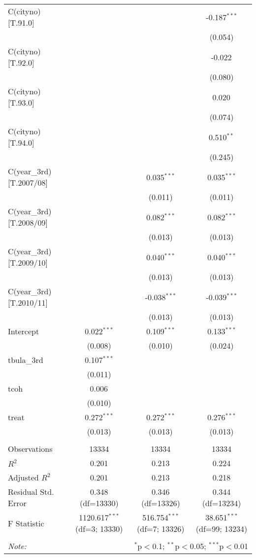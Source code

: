 \begin{table}[!htbp]
\begin{tabular}{@{\extracolsep{5pt}}lccc}
 C(cityno)[T.91.0] & & & -0.187$^{***}$ \\
& & & (0.054) \\
 C(cityno)[T.92.0] & & & -0.022$^{}$ \\
& & & (0.080) \\
 C(cityno)[T.93.0] & & & 0.020$^{}$ \\
& & & (0.074) \\
 C(cityno)[T.94.0] & & & 0.510$^{**}$ \\
& & & (0.245) \\
 C(year_3rd)[T.2007/08] & & 0.035$^{***}$ & 0.035$^{***}$ \\
& & (0.011) & (0.011) \\
 C(year_3rd)[T.2008/09] & & 0.082$^{***}$ & 0.082$^{***}$ \\
& & (0.013) & (0.013) \\
 C(year_3rd)[T.2009/10] & & 0.040$^{***}$ & 0.040$^{***}$ \\
& & (0.013) & (0.013) \\
 C(year_3rd)[T.2010/11] & & -0.038$^{***}$ & -0.039$^{***}$ \\
& & (0.013) & (0.013) \\
 Intercept & 0.022$^{***}$ & 0.109$^{***}$ & 0.133$^{***}$ \\
& (0.008) & (0.010) & (0.024) \\
 tbula_3rd & 0.107$^{***}$ & & \\
& (0.011) & & \\
 tcoh & 0.006$^{}$ & & \\
& (0.010) & & \\
 treat & 0.272$^{***}$ & 0.272$^{***}$ & 0.276$^{***}$ \\
& (0.013) & (0.013) & (0.013) \\
\hline \\[-1.8ex]
 Observations & 13334 & 13334 & 13334 \\
 $R^2$ & 0.201 & 0.213 & 0.224 \\
 Adjusted $R^2$ & 0.201 & 0.213 & 0.218 \\
 Residual Std. Error & 0.348 (df=13330) & 0.346 (df=13326) & 0.344 (df=13234) \\
 F Statistic & 1120.617$^{***}$ (df=3; 13330) & 516.754$^{***}$ (df=7; 13326) & 38.651$^{***}$ (df=99; 13234) \\
\hline
\hline \\[-1.8ex]
\textit{Note:} & \multicolumn{3}{r}{$^{*}$p$<$0.1; $^{**}$p$<$0.05; $^{***}$p$<$0.01} \\
\end{tabular}
\end{table}

